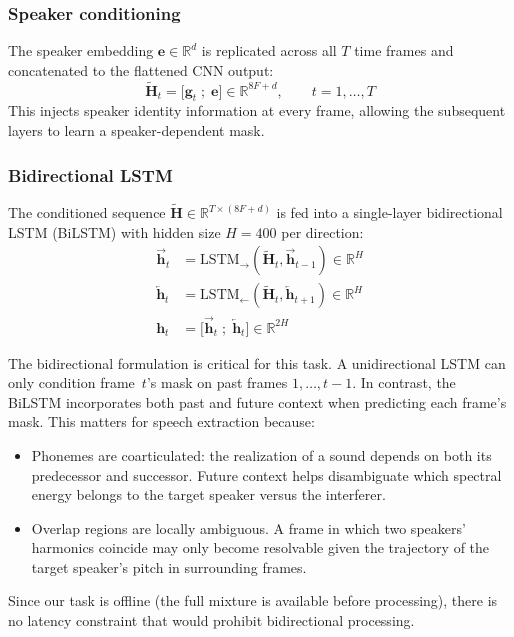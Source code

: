 \documentclass{article}
\begin{document}
\subsubsection{Speaker conditioning}
The speaker embedding $\mathbf{e} \in \mathbb{R}^d$ is replicated across all $T$ time frames and concatenated to the flattened CNN output:
\[
    \tilde{\mathbf{H}}_t = \bigl[\mathbf{g}_t \;;\; \mathbf{e}\bigr] \in \mathbb{R}^{8F + d}, \qquad t = 1, \dots, T
\]
This injects speaker identity information at every frame, allowing the subsequent layers to learn a speaker-dependent mask.

\subsubsection{Bidirectional LSTM}
The conditioned sequence $\tilde{\mathbf{H}} \in \mathbb{R}^{T \times (8F+d)}$ is fed into a single-layer bidirectional LSTM (BiLSTM) with hidden size $H = 400$ per direction:
\begin{align}
    \overrightarrow{\mathbf{h}}_t &= \text{LSTM}_{\rightarrow}(\tilde{\mathbf{H}}_t, \overrightarrow{\mathbf{h}}_{t-1}) \in \mathbb{R}^{H} \\
    \overleftarrow{\mathbf{h}}_t &= \text{LSTM}_{\leftarrow}(\tilde{\mathbf{H}}_t, \overleftarrow{\mathbf{h}}_{t+1}) \in \mathbb{R}^{H} \\
    \mathbf{h}_t &= \bigl[\overrightarrow{\mathbf{h}}_t \;;\; \overleftarrow{\mathbf{h}}_t\bigr] \in \mathbb{R}^{2H}
\end{align}

The bidirectional formulation is critical for this task. A unidirectional LSTM can only condition frame~$t$'s mask on past frames $1, \dots, t{-}1$. In contrast, the BiLSTM incorporates both past and future context when predicting each frame's mask. This matters for speech extraction because:
\begin{itemize}
    \item Phonemes are coarticulated: the realization of a sound depends on both its predecessor and successor. Future context helps disambiguate which spectral energy belongs to the target speaker versus the interferer.
    \item Overlap regions are locally ambiguous. A frame in which two speakers' harmonics coincide may only become resolvable given the trajectory of the target speaker's pitch in surrounding frames.
\end{itemize}
Since our task is offline (the full mixture is available before processing), there is no latency constraint that would prohibit bidirectional processing.
\end{document}
